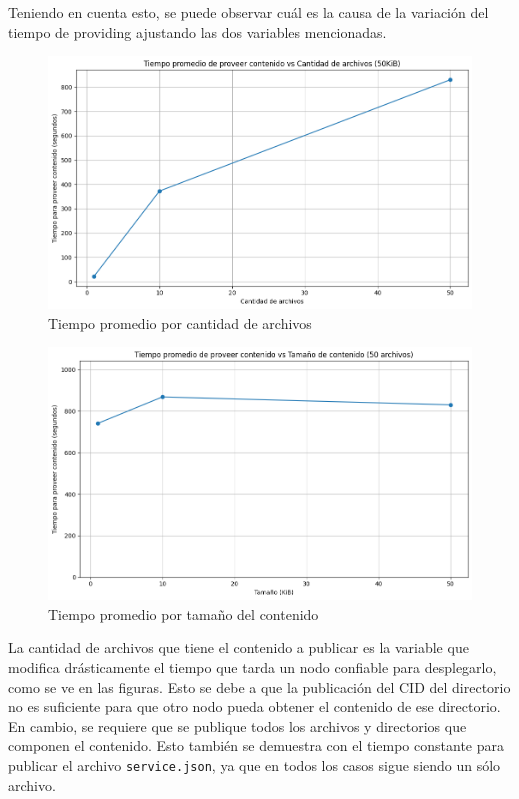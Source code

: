 Teniendo en cuenta esto, se puede observar cuál es la causa de la variación del tiempo de providing ajustando las dos variables mencionadas.

\begin{figure}[H]
    \centering
    \includegraphics[width=1\linewidth]{img/metricas-ipfs/tiempo-por-cant-archivos.png}
    \caption{Tiempo promedio por cantidad de archivos}
    \label{fig:tiempo-por-cant-archivos.png}
\end{figure}

\begin{figure}[H]
    \centering
    \includegraphics[width=1\linewidth]{img/metricas-ipfs/tiempo-por-tamano.png}
    \caption{Tiempo promedio por tamaño del contenido}
    \label{fig:tiempo-por-tamano.png}
\end{figure}

La cantidad de archivos que tiene el contenido a publicar es la variable que modifica drásticamente el tiempo que tarda un nodo confiable para desplegarlo, como se ve en las figuras. Esto se debe a que la publicación del CID del directorio no es suficiente para que otro nodo pueda obtener el contenido de ese directorio. En cambio, se requiere que se publique todos los archivos y directorios que componen el contenido. Esto también se demuestra con el tiempo constante para publicar el archivo \texttt{service.json}, ya que en todos los casos sigue siendo un sólo archivo. 

